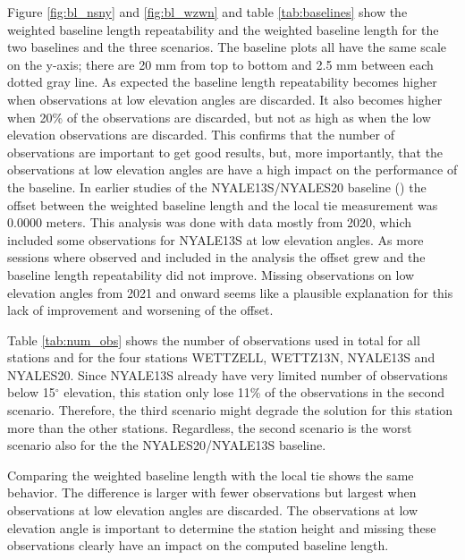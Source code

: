 \documentclass[twoside=semi,fontsize=12pt,paper=a4,titlepage=on]{kv_article}
\begin{document}
Figure \ref{fig:bl_nsny} and \ref{fig:bl_wzwn} and table \ref{tab:baselines} show the weighted baseline length repeatability and the weighted baseline length for the two baselines and the three scenarios. The baseline plots all have the same scale on the y-axis; there are 20 mm from top to bottom and 2.5 mm between each dotted gray line. As expected the baseline length repeatability becomes higher when observations at low elevation angles are discarded. It also becomes higher when 20\% of the observations are discarded, but not as high as when the low elevation observations are discarded. This confirms that the number of observations are important to get good results, but, more importantly, that the observations at low elevation angles are have a high impact on the performance of the baseline. In earlier studies of the NYALE13S/NYALES20 baseline (\cite{kirkvik2021}) the offset between the weighted baseline length and the local tie measurement was 0.0000 meters. This analysis was done with data mostly from 2020, which included some observations for NYALE13S at low elevation angles. As more sessions where observed and included in the analysis the offset grew and the baseline length repeatability did not improve. Missing observations on low elevation angles from 2021 and onward seems like a plausible explanation for this lack of improvement and worsening of the offset. 

Table \ref{tab:num_obs} shows the number of observations used in total for all stations and for the four stations WETTZELL, WETTZ13N, NYALE13S and NYALES20. Since NYALE13S already have very limited number of observations below 15$^\circ$ elevation, this station only lose 11\% of the observations in the second scenario. Therefore, the third scenario might degrade the solution for this station more than the other stations. Regardless, the second scenario is the worst scenario also for the the NYALES20/NYALE13S baseline. 

Comparing the weighted baseline length with the local tie shows the same behavior. The difference is larger with fewer observations but largest when observations at low elevation angles are discarded. The observations at low elevation angle is important to determine the station height and missing these observations clearly have an impact on the computed baseline length. 
\end{document}
